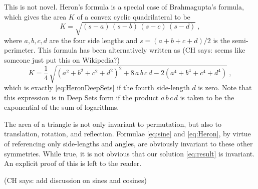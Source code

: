 \documentclass[12pt]{article}
\newcommand{\CH}[1]{{\color{blue} (CH says: #1)}}
\newcommand{\pseudosection}[1]
{}
\begin{document}
This is not novel. Heron's formula is a special case of Brahmagupta's formula, which gives the area $K$ of a convex cyclic quadrilateral to be \citep{coolidge1939}
\begin{equation}
    K = \sqrt{
        (s - a) \,
        (s - b) \,
        (s - c) \,
        (s - d)
    }~,
\end{equation}
where $a, b, c, d$ are the four side lengths and $s = (a+b+c+d)/2$ is the semi-perimeter. This formula has been alternatively written as \CH{seems like someone just put this on Wikipedia?}
\begin{equation}
    K = \frac{1}{4} \, \sqrt{
        \left( a^2 + b^2 + c^2 + d^2 \right)^2
        + 8 \, a\,b\,c\,d
        - 2 \left( a^4 + b^4 + c^4 + d^4 \right)
    }~,
\end{equation}
which is exactly \eqref{eq:HeronDeepSets} if the fourth side-length $d$ is zero. Note that this expression is in Deep Sets form if the product $a \, b \, c \, d$ is taken to be the exponential of the sum of logarithms.

\pseudosection{Discussion: other symmetries}

The area of a triangle is not only invariant to permutation, but also to translation, rotation, and reflection.
Formulae \eqref{eq:sine} and \eqref{eq:Heron}, by virtue of referencing only side-lengths and angles, are obviously invariant to these other symmetries.
While true, it is not obvious that our solution \eqref{eq:result} is invariant. An explicit proof of this is left to the reader.

\pseudosection{Discussion: sines and cosines}

\CH{add discussion on sines and cosines}

\pseudosection{Discussion: open questions}

\end{document}
